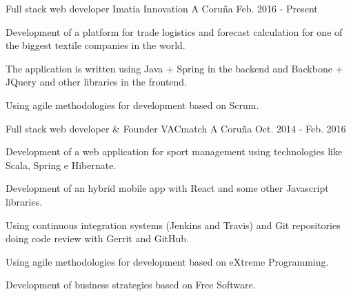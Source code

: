 


\begin{cventries}


\cventry
{Full stack web developer} %
{Imatia Innovation} %
{A Coruña} %
{Feb. 2016 - Present} %
{ %
\begin{cvitems}
\item {Development of a platform for trade logistics and forecast 
calculation for one of the biggest textile companies in the world.}
\item {The application is written using Java + Spring in the backend and
Backbone + JQuery and other libraries in the frontend.}
\item {Using agile methodologies for development based on Scrum.}
\end{cvitems}
}

\cventry
{Full stack web developer \& Founder} %
{VACmatch} %
{A Coruña} %
{Oct. 2014 - Feb. 2016} %
{ %
\begin{cvitems}
\item {Development of a web application for sport management using 
technologies like Scala, Spring e Hibernate.}
\item {Development of an hybrid mobile app with React and some other 
Javascript libraries.}
\item {Using continuous integration systems (Jenkins and Travis) and Git 
repositories doing code review with Gerrit and GitHub.}
\item {Using agile methodologies for development based on eXtreme 
Programming.}
\item {Development of business strategies based on Free Software.}
\end{cvitems}
}



\end{cventries}